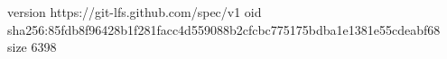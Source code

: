 version https://git-lfs.github.com/spec/v1
oid sha256:85fdb8f96428b1f281facc4d559088b2cfcbc775175bdba1e1381e55cdeabf68
size 6398

